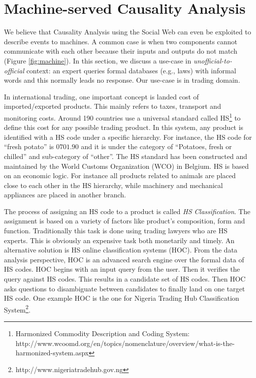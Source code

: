 \documentclass[conference]{IEEEtran}
\begin{document}
\section{Machine-served Causality Analysis}
\label{sec:machine}
We believe that Causality Analysis using the Social Web can even be exploited to describe events to machines. A common case is when two components cannot communicate with each other because their inputs and outputs do not match (Figure \ref{fig:machine}). In this section, we discuss a use-case in {\em unofficial-to-official} context: an expert queries formal databases (e.g., laws) with informal words and this normally leads no response. Our use-case is in trading domain.

In international trading, one important concept is landed cost of imported/exported products. This mainly refers to taxes, transport and monitoring costs. Around 190 countries use a universal standard called HS\footnote{Harmonized Commodity Description and Coding System: http://www.wcoomd.org/en/topics/nomenclature/overview/what-is-the-harmonized-system.aspx} to define this cost for any possible trading product. In this system, any product is identified with a HS code under a specific hierarchy. For instance, the HS code for ``fresh potato'' is $0701.90$ and it is under the category of ``Potatoes, fresh or chilled'' and sub-category of ``other''. The HS standard has been constructed and maintained by the World Customs Organization (WCO) in Belgium. HS is based on an economic logic. For instance all products related to animals are placed close to each other in the HS hierarchy, while machinery and mechanical appliances are placed in another branch. 
 
The process of assigning an HS code to a product is called {\em HS Classification}. The assignment is based on a variety of factors like product's composition, form and function. Traditionally this task is done using trading lawyers who are HS experts. This is obviously an expensive task both monetarily and timely. An alternative solution is HS online classification systems (HOC). From the data analysis perspective, HOC is an advanced search engine over the formal data of HS codes. HOC begins with an input query from the user. Then it verifies the query against HS codes. This results in a candidate set of HS codes. Then HOC asks questions to disambiguate between candidates to finally land on one target HS code. One example HOC is the one for Nigeria Trading Hub Classification System\footnote{http://www.nigeriatradehub.gov.ng}.
\end{document}
